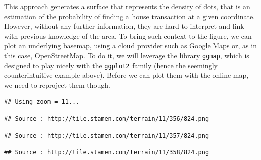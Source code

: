 \documentclass[
]{book}
\newenvironment{Shaded}{\begin{snugshade}}{\end{snugshade}}
\newcommand{\CommentTok}[1]{\textcolor[rgb]{0.56,0.35,0.01}{\textit{#1}}}
\newcommand{\DataTypeTok}[1]{\textcolor[rgb]{0.13,0.29,0.53}{#1}}
\newcommand{\DecValTok}[1]{\textcolor[rgb]{0.00,0.00,0.81}{#1}}
\newcommand{\KeywordTok}[1]{\textcolor[rgb]{0.13,0.29,0.53}{\textbf{#1}}}
\newcommand{\NormalTok}[1]{#1}
\newcommand{\OperatorTok}[1]{\textcolor[rgb]{0.81,0.36,0.00}{\textbf{#1}}}
\newcommand{\StringTok}[1]{\textcolor[rgb]{0.31,0.60,0.02}{#1}}
\begin{document}
This approach generates a surface that represents the density of dots, that is an estimation of the probability of finding a house transaction at a given coordinate. However, without any further information, they are hard to interpret and link with previous knowledge of the area. To bring such context to the figure, we can plot an underlying basemap, using a cloud provider such as Google Maps or, as in this case, OpenStreetMap. To do it, we will leverage the library \texttt{ggmap}, which is designed to play nicely with the \texttt{ggplot2} family (hence the seemingly counterintuitive example above). Before we can plot them with the online map, we need to reproject them though.

\begin{Shaded}
\end{Shaded}

\begin{verbatim}
## Using zoom = 11...
\end{verbatim}

\begin{verbatim}
## Source : http://tile.stamen.com/terrain/11/356/824.png
\end{verbatim}

\begin{verbatim}
## Source : http://tile.stamen.com/terrain/11/357/824.png
\end{verbatim}

\begin{verbatim}
## Source : http://tile.stamen.com/terrain/11/358/824.png
\end{verbatim}
\end{document}
